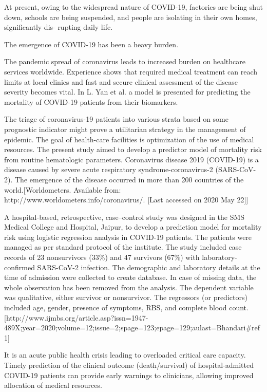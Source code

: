 At present, owing to the widespread nature of COVID-19, factories are being shut down, schools are being suspended, and people are isolating in their own homes, significantly dis- rupting daily life.

The emergence of COVID-19 has been a heavy burden.

The pandemic spread of coronavirus leads to increased burden on healthcare services worldwide. Experience shows that required medical treatment can reach limits at local clinics and fast and secure clinical assessment of the disease severity becomes vital. In L. Yan et al. a model is presented for predicting the mortality of COVID-19 patients from their biomarkers. 

The triage of coronavirus-19 patients into various strata based on some prognostic indicator might prove a utilitarian strategy in the management of epidemic. The goal of health-care facilities is optimization of the use of medical resources. The present study aimed to develop a predictor model of mortality risk from routine hematologic parameters. 
Coronavirus disease 2019 (COVID-19) is a disease caused by severe acute respiratory syndrome-coronavirus-2 (SARS-CoV-2). The emergence of the disease occurred in more than 200 countries of the world.[Worldometers. Available from: http://www.worldometers.info/coronavirus/. [Last accessed on 2020 May 22]] 

A hospital-based, retrospective, case–control study was designed in the SMS Medical College and Hospital, Jaipur, to develop a prediction model for mortality risk using logistic regression analysis in COVID-19 patients. The patients were managed as per standard protocol of the institute. The study included case records of 23 nonsurvivors (33\%) and 47 survivors (67\%) with laboratory-confirmed SARS-CoV-2 infection. The demographic and laboratory details at the time of admission were collected to create database. In case of missing data, the whole observation has been removed from the analysis. The dependent variable was qualitative, either survivor or nonsurvivor. The regressors (or predictors) included age, gender, presence of symptoms, RBS, and complete blood count.[http://www.ijmbs.org/article.asp?issn=1947-489X;year=2020;volume=12;issue=2;spage=123;epage=129;aulast=Bhandari#ref1]

It is an acute public health crisis leading to overloaded critical care capacity. Timely prediction of the clinical outcome (death/survival) of hospital-admitted COVID-19 patients can provide early warnings to clinicians, allowing improved allocation of medical resources.

